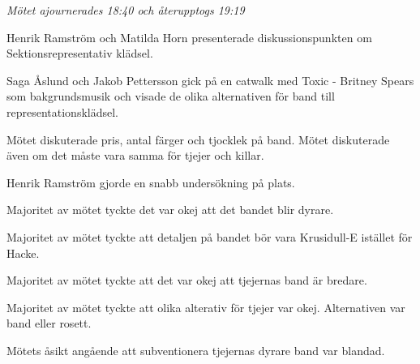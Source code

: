 \documentclass[10pt]{article}
\begin{document}
\begin{paragrafer}
\textit{Mötet ajournerades 18:40 och återupptogs 19:19}


Henrik Ramström och Matilda Horn presenterade diskussionspunkten om Sektionsrepresentativ klädsel. 

Saga Åslund och Jakob Pettersson gick på en catwalk med Toxic - Britney Spears som bakgrundsmusik och visade de olika alternativen för band till representationsklädsel.

Mötet diskuterade pris, antal färger och tjocklek på band. Mötet diskuterade även om det måste vara samma för tjejer och killar. 


Henrik Ramström gjorde en snabb undersökning på plats. 

Majoritet av mötet tyckte det var okej att det bandet blir dyrare. 

Majoritet av mötet tyckte att detaljen på bandet bör vara Krusidull-E istället för Hacke.

Majoritet av mötet tyckte att det var okej att tjejernas band är bredare. 

Majoritet av mötet tyckte att olika alterativ för tjejer var okej. Alternativen var band eller rosett.

Mötets åsikt angående att subventionera tjejernas dyrare band var blandad. 

\begin{comment}
Adam undrade vad priset lanande på. Henrik svarade att det landade på cirka 160kr. Henrik drog ner antalet färgband för att få ner priset.
Sophia undrade om tjejernas band får plats med medaljer. Sophia kår sa att det går bra. 

Tove - detalj pris vs detalj med Hacke eller bredare bandet.
THeo - kommentar ang vit väst. Det försvinner lite för killarna iom att vi har vit väst. 

Joakim - Ett till färgförslag. 
Filip tycker att det gamla bandet är snyggare. 5 färger är snyggt och cleant. Inga åsikter till tjejerna men förstår att det inte är lika bra. 
Edvard - tycker det gamla bandet är klart snyggare och fölkjet tlth standard -- naturligt att det blir dyrare men viktigare att det är enhetligt och att vi kan få samhörighet och poäng aatt ha likadana ordensband för tjejr och killar.
Stpeh - Najs om vi har samma. Men tycker att vi ska ha svart-vit-svart. För att det ser snyggare ut. -> Tjockare band är snyggare. Vill gärna att vi ocskå har en detalj. Tycker det gamla har varit kasst och tycker det ska bli kul att byta. Värt kostnadet. 


\end{comment}
\end{paragrafer}
\end{document}
